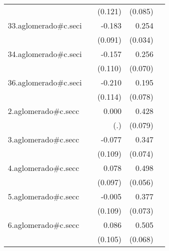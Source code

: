 {\begin{longtable}{l*{4}{D{.}{.}{-1}}}
            &                     &     (0.121)         &     (0.085)         &                     \\
\addlinespace
33.aglomerado#c.seci&                     &      -0.183\sym{*}  &       0.254\sym{***}&                     \\
            &                     &     (0.091)         &     (0.034)         &                     \\
\addlinespace
34.aglomerado#c.seci&                     &      -0.157         &       0.256\sym{***}&                     \\
            &                     &     (0.110)         &     (0.070)         &                     \\
\addlinespace
36.aglomerado#c.seci&                     &      -0.210         &       0.195\sym{*}  &                     \\
            &                     &     (0.114)         &     (0.078)         &                     \\
\addlinespace
2.aglomerado#c.secc&                     &       0.000         &       0.428\sym{***}&                     \\
            &                     &         (.)         &     (0.079)         &                     \\
\addlinespace
3.aglomerado#c.secc&                     &      -0.077         &       0.347\sym{***}&                     \\
            &                     &     (0.109)         &     (0.074)         &                     \\
\addlinespace
4.aglomerado#c.secc&                     &       0.078         &       0.498\sym{***}&                     \\
            &                     &     (0.097)         &     (0.056)         &                     \\
\addlinespace
5.aglomerado#c.secc&                     &      -0.005         &       0.377\sym{***}&                     \\
            &                     &     (0.109)         &     (0.073)         &                     \\
\addlinespace
6.aglomerado#c.secc&                     &       0.086         &       0.505\sym{***}&                     \\
            &                     &     (0.105)         &     (0.068)         &                     \\

\end{longtable}}
